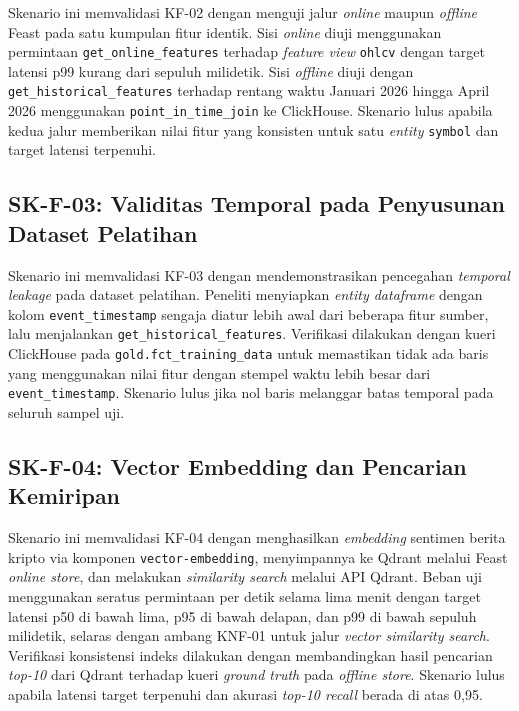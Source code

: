 Skenario ini memvalidasi KF-02 dengan menguji jalur \textit{online} maupun \textit{offline} Feast pada satu kumpulan fitur identik. Sisi \textit{online} diuji menggunakan permintaan \texttt{get\_online\_features} terhadap \textit{feature view} \texttt{ohlcv} dengan target latensi p99 kurang dari sepuluh milidetik. Sisi \textit{offline} diuji dengan \texttt{get\_historical\_features} terhadap rentang waktu Januari 2026 hingga April 2026 menggunakan \texttt{point\_in\_time\_join} ke ClickHouse. Skenario lulus apabila kedua jalur memberikan nilai fitur yang konsisten untuk satu \textit{entity} \texttt{symbol} dan target latensi terpenuhi.

\subsection{SK-F-03: Validitas Temporal pada Penyusunan Dataset Pelatihan}

Skenario ini memvalidasi KF-03 dengan mendemonstrasikan pencegahan \textit{temporal leakage} pada dataset pelatihan. Peneliti menyiapkan \textit{entity dataframe} dengan kolom \texttt{event\_timestamp} sengaja diatur lebih awal dari beberapa fitur sumber, lalu menjalankan \texttt{get\_historical\_features}. Verifikasi dilakukan dengan kueri ClickHouse pada \texttt{gold.fct\_training\_data} untuk memastikan tidak ada baris yang menggunakan nilai fitur dengan stempel waktu lebih besar dari \texttt{event\_timestamp}. Skenario lulus jika nol baris melanggar batas temporal pada seluruh sampel uji.

\subsection{SK-F-04: Vector Embedding dan Pencarian Kemiripan}

Skenario ini memvalidasi KF-04 dengan menghasilkan \textit{embedding} sentimen berita kripto via komponen \texttt{vector-embedding}, menyimpannya ke Qdrant melalui Feast \textit{online store}, dan melakukan \textit{similarity search} melalui API Qdrant. Beban uji menggunakan seratus permintaan per detik selama lima menit dengan target latensi p50 di bawah lima, p95 di bawah delapan, dan p99 di bawah sepuluh milidetik, selaras dengan ambang KNF-01 untuk jalur \textit{vector similarity search}. Verifikasi konsistensi indeks dilakukan dengan membandingkan hasil pencarian \textit{top-10} dari Qdrant terhadap kueri \textit{ground truth} pada \textit{offline store}. Skenario lulus apabila latensi target terpenuhi dan akurasi \textit{top-10 recall} berada di atas 0,95.

